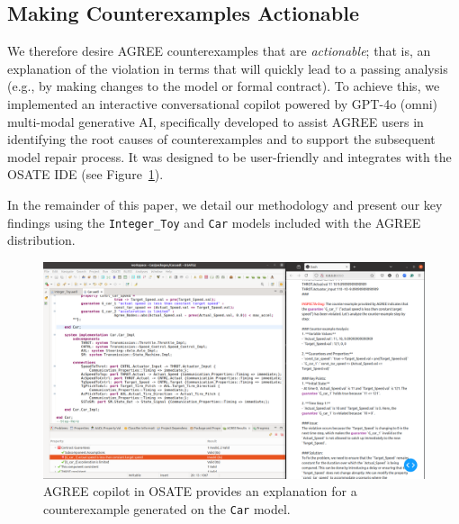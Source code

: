 \subsection{Making Counterexamples Actionable} 
We therefore desire AGREE counterexamples that are \textit{actionable}; that is, an explanation of the violation in terms that will quickly lead to a passing analysis (e.g., by making changes to the model or formal contract).
%
To achieve this, we implemented
an interactive conversational copilot powered by GPT-4o (omni) multi-modal generative AI, specifically developed to assist AGREE users in identifying the root causes of counterexamples and to support the subsequent model repair process. It was designed to be user-friendly and integrates with the OSATE IDE (see Figure~\ref{fig:AGREEDOG}). 

In the remainder of this paper, we detail our methodology and present our key findings using the \texttt{Integer\_Toy} and \texttt{Car} models included with the AGREE distribution.

\begin{figure}[t]  
    \centering
    \includegraphics[height=0.6\textwidth, width=1.0\textwidth]{AGREE-DOG-high-rs.png}%
    \caption{AGREE copilot in OSATE provides an explanation for a counterexample generated on the \texttt{Car} model.}
    \label{fig:AGREEDOG}
\end{figure}



